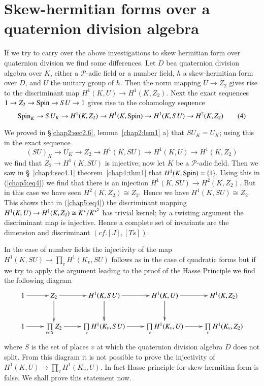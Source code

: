  \section*{Skew-hermitian forms over a quaternion division algebra}
 
 If we try to carry over the above investigations to skew hermitian
 form over quaternion division we find some differences. Let $D$
 be\pageoriginale a
 quaternion division algebra over $K$, either a $\mathscr{P}$-adic
 field or a number field, $h$ a skew-hermitian form over $D$, and $U$
 the unitary group of $h$. Then the norm mapping $U \to Z_2$ gives
 rise to the discriminant map $H^1(K,U) \to H^1(K,Z_2)$. Next the
 exact sequences $1 \to Z_2 \to \operatorname{Spin} \to SU \to 1$ gives rise to the
 cohomology sequence   
{\fontsize{10}{12}\selectfont
\begin{equation*}
\operatorname{Spin}_K \to SU_K \to H^1 (K,Z_2) \to H^1 (K,\operatorname{Spin}) \to H^1(K,SU) \to
H^2(K,Z_2) \tag{4} \label{chap5:eq4}
 \end{equation*}} 
 
 We proved in \S \ref{chap2:sec2.6}, lemma~\ref{chap2:lem1} a) that
 $SU_K=U_K$; using this in 
 the exact sequence 
 $$
 (SU)_K \to U_K \to Z_2 \to H^1 (K,SU) \to H^1(K,U) \to H^1(K,Z_2)
 $$
we find that
 $Z_2 \to H^1 (K,SU)$ is injective; now let $K$ be a
 $\mathscr{P}$-adic field. Then we saw in \S~\ref{chap4:sec4.1}
theorem~\ref{chap4:thm1} that
 $H^1 (K,\operatorname{Spin})= \{ 1\}$. Using this in (\ref{chap5:eq4}) we find that
there is an 
 injection $H^1(K,SU) \to H^2 (K,Z_2)$.  But in this case we have seen
 $H^2 (K,Z_2)\cong Z_2$. Hence we have $H^1(K,SU)\cong Z_2$. This
 shows that in (\ref{chap5:eq4}) the discriminant mapping $H^1(K,U) \to H^1
 (K,\break Z_2) \cong K^* /K^{*^2}$ has trivial kernel; by a twisting
 argument the discriminant map is injective. Hence a complete set of
 invariants are the dimension and discriminant $(cf. [J],[Ts])$. 

 In the case of number fields the injectivity of the map $H^1(K,SU)\to
 \prod\limits_v H^1(K_v,SU)$ follows as in the case of quadratic forms
 but if we try to apply the argument leading to the proof of the 
 Hasse Principle we find the following diagram 
{\fontsize{9}{11}\selectfont
\[
\xymatrix{
1 \ar[r] & Z_2 \ar[r] \ar[d] & H^1 (K, SU) \ar[r] \ar[d] & H^1 (K,U)
\ar[r] \ar[d] & H^1 (K,Z_2) \\
1 \ar[r] & \prod\limits_{v \in S} Z_2 \ar[r] & \prod\limits_v H^1
(K_v, SU) \ar[r] & \prod\limits_v H^1 (K_v, U) \ar[r] & \prod\limits_v
H^1 (K_v, Z_2)
}
\]}\pageoriginale
where $S$ is the set of places $v$ at which the quaternion division
algebra $D$ does not split. From this diagram it is not possible to
prove the injectivity of $H^1(K,U) \to \prod\limits_{v}
H^1(K_v,U)$. In fact Hasse principle for skew-hermitian form is
false. We shall prove this statement now. 

